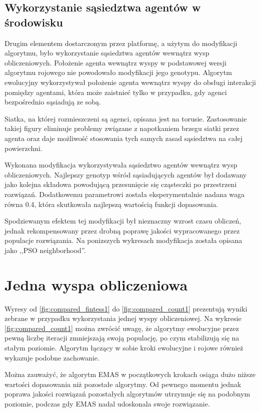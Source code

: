 \subsection*{Wykorzystanie sąsiedztwa agentów w środowisku}

Drugim elementem dostarczonym przez platformę, a użytym do modyfikacji algorytmu, było wykorzystanie sąsiedztwa agentów wewnątrz wysp obliczeniowych. Położenie agenta wewnątrz wyspy w podstawowej wersji algorytmu rojowego nie powodowało modyfikacji jego genotypu. Algorytm ewolucyjny wykorzystywał położenie agenta wewnątrz wyspy do obsługi interakcji pomiędzy agentami, która może zaistnieć tylko w przypadku, gdy agenci bezpośrednio sąsiadują ze sobą.

Siatka, na której rozmieszczeni są agenci, opisana jest na torusie. Zastosowanie takiej figury eliminuje problemy związane z napotkaniem brzegu siatki przez agenta oraz daje możliwość stosowania tych samych zasad sąsiedztwa na całej powierzchni.

Wykonana modyfikacja wykorzystywała sąsiedztwo agentów wewnątrz wysp obliczeniowych. Najlepszy genotyp wśród sąsiadujących agentów był dodawany jako kolejna składowa powodującą przesunięcie się cząsteczki po przestrzeni rozwiązań. Dodatkowemu parametrowi została eksperymentalnie nadana waga równa 0.4, która skutkowała najlepszą wartością funkcji dopasowania.

Spodziewanym efektem tej modyfikacji był nieznaczny wzrost czasu obliczeń, jednak rekompensowany przez drobną poprawę jakości wypracowanego przez populacje rozwiązania. Na ponizszych wykresach modyfikacja została opisana jako ,,PSO neighborhood''.

\section{Jedna wyspa obliczeniowa}
\label{sec:jednawyspa}

Wyresy od \ref{fig:compared_fintess1} do \ref{fig:compared_count1} prezentują wyniki zebrane w przypadku wykorzystania jednej wyspy obliczeniowej. Na wykresie \ref{fig:compared_count1} można zwrócić uwagę, że algorytmy ewolucyjne przez pewną liczbę iteracji zmniejszają swoją populację, po czym stabilizują się na stałym poziomie. Algorytm łączący w sobie kroki ewolucyjne i rojowe również wykazuje podobne zachowanie.

Można zauważyć, że algorytm EMAS w początkowych krokach osiąga dużo niższe wartości dopasowania niż pozostałe algorytmy. Od pewnego momentu jednak poprawa jakości rozwiązań pozostałych algorytmów utrzymuje się na podobnym poziomie, podczas gdy EMAS nadal udoskonala swoje rozwiązanie. 

